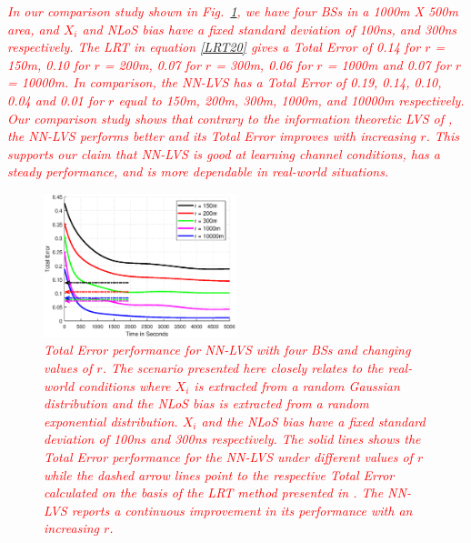 \documentclass[journal]{IEEEtran}
\begin{document}
\textcolor{red}{\textit{In our comparison study shown in Fig.~\ref{New_30}, we have four BSs in a 1000m X 500m area, and $X_i$ and NLoS bias have a fixed standard deviation of 100ns, and 300ns respectively. The LRT in equation \eqref{LRT20} gives a Total Error of 0.14 for $r$ = 150m, 0.10 for $r$ = 200m, 0.07 for $r$ = 300m, 0.06 for $r$ = 1000m and 0.07 for $r$ = 10000m. In comparison, the NN-LVS has a Total Error of 0.19, 0.14, 0.10, 0.04 and 0.01 for $r$ equal to 150m, 200m, 300m, 1000m, and 10000m respectively. Our comparison study shows that contrary to the information theoretic LVS of \cite{Ausctw}, the NN-LVS performs better and its Total Error improves with increasing $r$. This supports our claim that NN-LVS is good at learning channel conditions, has a steady performance, and is more dependable in real-world situations.}}
\begin{figure}[t!]
\includegraphics[width=0.50\textwidth]{final-T100-N300-V4-arrow.eps}
\caption{\textcolor{red}{\textit{Total Error performance for NN-LVS with four BSs and changing values of $r$. The scenario presented here closely relates to the real-world conditions where $X_i$ is extracted from a random Gaussian distribution and the NLoS bias is extracted from a random exponential distribution. $X_i$ and the NLoS bias have a fixed standard deviation of 100ns and 300ns respectively. The solid lines shows the Total Error performance for the NN-LVS under different values of $r$ while the dashed arrow lines point to the respective Total Error calculated on the basis of the LRT method presented in \cite{Ausctw}. The NN-LVS reports a continuous improvement in its performance with an increasing $r$.}}\label{New_30}}
\end{figure}
\end{document}
